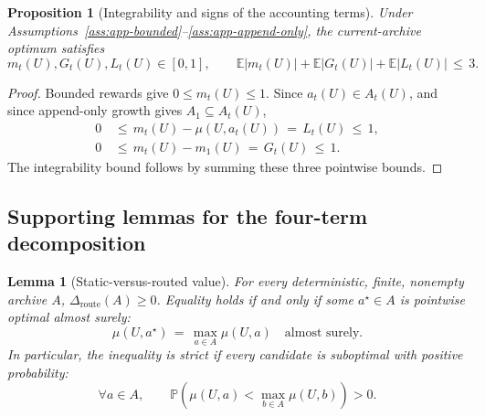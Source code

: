 \documentclass{article} %
\newtheorem{lemma}[theorem]{Lemma}
\newtheorem{proposition}[theorem]{Proposition}
\begin{document}
\begin{proposition}[Integrability and signs of the accounting terms]
\label{prop:1}
Under Assumptions~\ref{ass:app-bounded}--\ref{ass:app-append-only}, the current-archive optimum satisfies
\begin{equation}
m_t(U),G_t(U),L_t(U)\in[0,1],
\qquad
\mathbb E|m_t(U)|+\mathbb E|G_t(U)|+\mathbb E|L_t(U)|
\,\leq\,3.
\end{equation}
\end{proposition}

\begin{proof}
Bounded rewards give \(0\leq m_t(U)\leq1\).  Since
\(a_t(U)\in A_t(U)\), and since append-only growth gives
\(A_1\subseteq A_t(U)\),
\begin{equation}
\begin{aligned}
0
&\,\leq\,m_t(U)-\mu(U,a_t(U))
      \,=\,L_t(U)\,\leq\,1, \\
0
&\,\leq\,m_t(U)-m_1(U)
      \,=\,G_t(U)\,\leq\,1.
\end{aligned}
\end{equation}
The integrability bound follows by summing these three pointwise bounds.
\end{proof}

\subsection{Supporting lemmas for the four-term decomposition}

\begin{lemma}[Static-versus-routed value]
\label{lem:1}
For every deterministic, finite, nonempty archive \(A\),
\(\Delta_{\mathrm{route}}(A)\geq0\).  Equality holds if and only if some
\(a^\star\in A\) is pointwise optimal almost surely:
\begin{equation}
\mu(U,a^\star)
\,=\,
\max_{a\in A}\mu(U,a)
\quad
\text{almost surely}.
\end{equation}
In particular, the inequality is strict if every candidate is suboptimal with
positive probability:
\begin{equation}
\forall a\in A,
\qquad
\mathbb{P}\!\left(
\mu(U,a)
<
\max_{b\in A}\mu(U,b)
\right)
>
0.
\end{equation}
\end{lemma}
\end{document}
